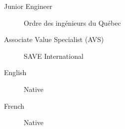 \documentclass[11pt, letterpaper]{awesome-cv}
\begin{document}
\begin{description}
    \item[Junior Engineer] Ordre des ingénieurs du Québec
    \item[Associate Value Specialist (AVS)] SAVE International
    \end{description}

\begin{description}
    \item[English] Native
    \item[French] Native
    \end{description}
\end{document}

